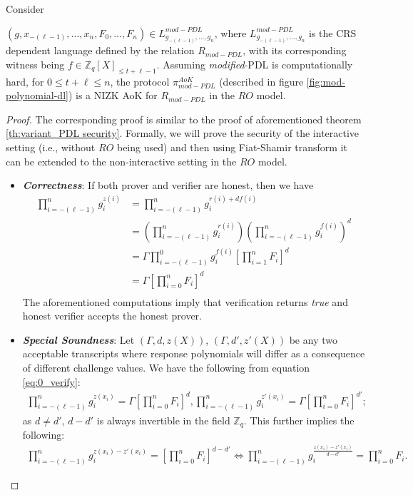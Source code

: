 \begin{theorem}\label{th:modified_PDL security}
  Consider\par $(g,x_{-(\ell-1)},\dots,x_n,F_0,\dots,F_n)\in L_{g_{-(\ell-1)},\dots,g_n}^{mod-PDL}$, where 
  $L_{g_{-(\ell-1)},\dots,g_n}^{mod-PDL}$ is the CRS dependent language defined by the relation 
  $R_{mod-PDL}$,
  with its corresponding witness being $f\in\mathbb{Z}_q[X]_{\leq t+\ell-1}$.
  Assuming \textit{modified}-PDL is computationally hard, for 
  $0\leq t+\ell\leq n$, the protocol $\pi_{mod-PDL}^{AoK}$ (described in figure \ref{fig:mod-polynomial-dl}) is a 
  NIZK AoK for $R_{mod-PDL}$ in the $RO$ model.
\end{theorem}
\begin{proof}
  The corresponding proof is similar to the proof of aforementioned theorem \ref{th:variant_PDL security}. 
  Formally, we will prove the security of the interactive setting (i.e., without $RO$ being used) and then 
  using Fiat-Shamir transform it can be extended to the non-interactive setting in the $RO$ model. 

  \begin{itemize}
    \item \textit{\textbf{Correctness}}: If both prover and verifier are honest, then
      we have 
      \begin{align}\label{eq:0_verify}
        \prod_{i=-(\ell-1)}^{n}g_i^{z(i)}&=\prod_{i=-(\ell-1)}^{n}g_i^{r(i)+df(i)}\nonumber\\
        &=(\prod_{i=-(\ell-1)}^{n}g_i^{r(i)})(\prod_{i=-(\ell-1)}^{n}g_i^{f(i)})^d\nonumber\\
        &=\Gamma \prod_{i=-(\ell-1)}^{0}g_i^{f(i)}\left[\prod_{i=1}^{n}F_i\right]^d\nonumber\\
        &=\Gamma \left[\prod_{i=0}^{n}F_i\right]^d\nonumber\\
      \end{align}
      The aforementioned computations imply that verification returns \textit{true} and honest verifier accepts the 
      honest prover.
    \item \textit{\textbf{Special Soundness}}: Let $(\Gamma,d,z(X))$, $(\Gamma,d',z'(X))$ 
      be any two acceptable transcripts where response polynomials will differ as a consequence of different challenge 
      values. We have the following from equation \ref{eq:0_verify}:
      \begin{align*}
        \prod_{i=-(\ell-1)}^{n}g_i^{z(x_i)}=\Gamma \left[\prod_{i=0}^{n}F_i\right]^d,\prod_{i=-(\ell-1)}^{n}g_i^{z'(x_i)}=\Gamma \left[\prod_{i=0}^{n}F_i\right]^{d'};
      \end{align*}
      as $d\neq d'$, $d-d'$ is always invertible in the field $\mathbb{Z}_q$. This further implies 
      the following:
      \begin{align}\label{eq:0_Equality}
        \prod_{i=-(\ell-1)}^{n}g_i^{z(x_i)-z'(x_i)}=\left[\prod_{i=0}^{n}F_i\right]^{d-d'} \iff \prod_{i=-(\ell-1)}^{n}g_i^{\frac{z(x_i)-z'(x_i)}{d-d'}}=\prod_{i=0}^{n}F_i.
      \end{align}


\end{itemize}
\end{proof}
